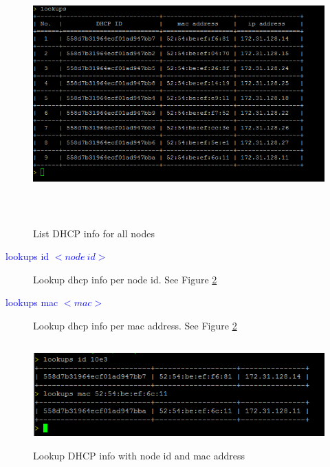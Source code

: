 \documentclass [12pt, a4paper, titlepage]{article}
\begin{document}
        \begin{figure}[H]
        \begin{center}
        \includegraphics[width=13cm,height=10cm]{png/lookups.png}
        \end{center}
        \caption{List DHCP info for all nodes}
        \label{lookups_fig}
        \end{figure}

        \begin{description}
            \item[\textcolor{blue}{lookups id $<node\ id>$}] Lookup dhcp info per node id. See Figure \ref{lookups_fig2}
        \end{description}


        \begin{description}
            \item[\textcolor{blue}{lookups mac $<mac>$}] Lookup dhcp info per mac address. See Figure \ref{lookups_fig2}
        \end{description}

        \begin{figure}[H]
        \begin{center}
        \includegraphics[width=13cm,height=4cm]{png/lookups2.png}
        \end{center}
        \caption{Lookup DHCP info  with node id and mac address}
        \label{lookups_fig2}
        \end{figure}
\end{document}
